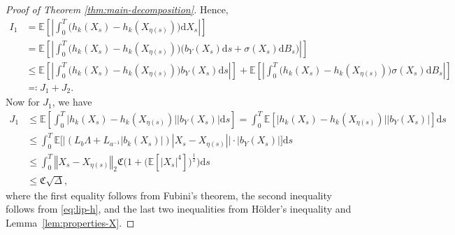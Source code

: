 \documentclass{article}
\theoremstyle{plain}
\theoremstyle{definition}
\theoremstyle{remark}
\renewcommand{\d}{\mathrm{d}}
\newcommand{\EE}{\mathbb{E}}
\begin{document}
\begin{proof}[Proof of Theorem \ref{thm:main-decomposition}]


Hence, 
\begin{align}
    I_1 &= \EE \left[ \left|\int_0^T \big( h_k(X_s)-h_k(X_{\eta(s)})\big)\d X_s\right|\right] \nonumber\\
    &= \EE \left[ \left|\int_0^T \big( h_k(X_s)-h_k(X_{\eta(s)})\big)\big(b_Y(X_s)\d s+\sigma (X_s)\d B_s\big)\right|\right]  \nonumber\\
    &\leq \EE \left[\left|\int_0^T \big( h_k(X_s)-h_k(X_{\eta(s)})\big)b_Y(X_s)\d s\right|\right] + \EE \left[\left|\int_0^T \big( h_k(X_s)-h_k(X_{\eta(s)})\big) \sigma (X_s)\d B_s\right|\right]\nonumber\\
    &\eqqcolon J_1+ J_2.
\end{align}
Now for $J_1$, we have
\begin{align}
J_1 &\leq \EE \left[ \int_0^T  \big| h_k(X_s)-h_k(X_{\eta(s)})\big| \big|b_Y(X_s)\big| \d s\right] = \int_0^T  \EE \left[ \big| h_k(X_s)-h_k(X_{\eta(s)})\big| \big|b_Y(X_s)\big|\right ]\d s \nonumber\\
&\leq \int_0^T\EE \Big[ \big| (L_b\Lambda + L_{a^{-1}}|b_k(X_s)|)|X_s-X_{\eta(s)}|\big| \cdot \big|b_Y(X_s)\big|\Big ]\d s \nonumber\\
&\leq \int_0^T \left \Vert X_s-X_{\eta(s)} \right\Vert_2 \mathfrak{C}\Big(1+  \big(\EE[ |X_s |^4]\big)^{\frac{1}{2}}\Big) \d s\nonumber\\
&\leq \mathfrak{C} \sqrt{\Delta},
\end{align}
where the first equality follows from Fubini’s theorem, the second inequality follows from \eqref{eq:lip-h}, and the last two inequalities from Hölder’s inequality and Lemma~\ref{lem:properties-X}.




\end{proof}
\end{document}
